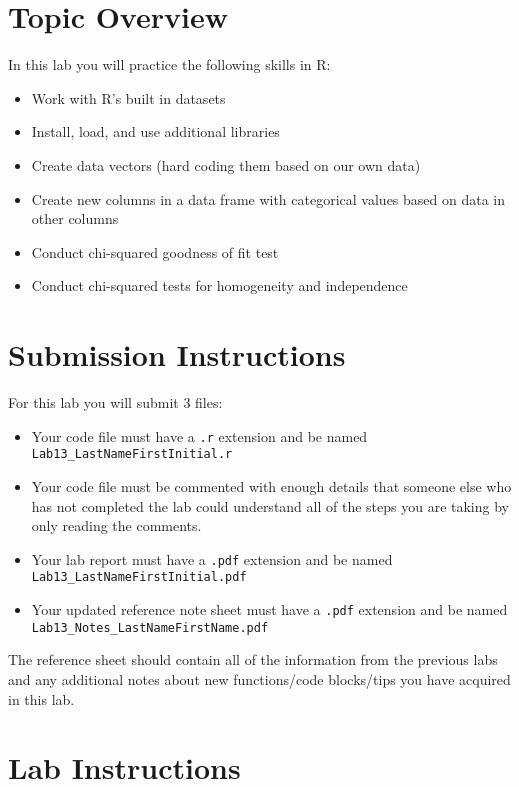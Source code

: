\documentclass{article}
\begin{document}
\section{Topic Overview}

In this lab you will practice the following skills in R:

\begin{itemize}
    \item Work with R’s built in datasets
    \item Install, load, and use additional libraries
    \item Create data vectors (hard coding them based on our own data)
    \item Create new columns in a data frame with categorical values based on data in other columns
    \item Conduct chi-squared goodness of fit test
    \item Conduct chi-squared tests for homogeneity and independence
\end{itemize}

\section*{Submission Instructions}

For this lab you will submit 3 files:

\begin{itemize}
    \item Your code file must have a \texttt{.r} extension and be named \texttt{Lab13\_LastNameFirstInitial.r}
    \item Your code file must be commented with enough details that someone else who has not completed the lab could understand all of the steps you are taking by only reading the comments.
    \item Your lab report must have a \texttt{.pdf} extension and be named \texttt{Lab13\_LastNameFirstInitial.pdf}
    \item Your updated reference note sheet must have a \texttt{.pdf} extension and be named \texttt{Lab13\_Notes\_LastNameFirstName.pdf}
\end{itemize}

The reference sheet should contain all of the information from the previous labs and any additional notes about new functions/code blocks/tips you have acquired in this lab.

\section*{Lab Instructions}
\end{document}
